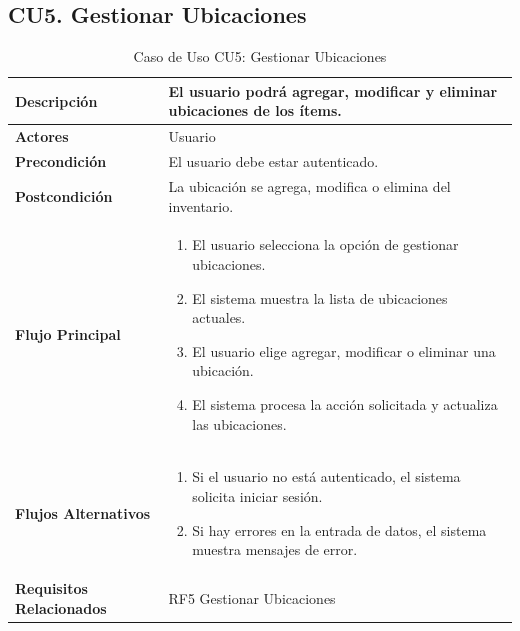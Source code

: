\documentclass{article}
\begin{document}
\subsection{CU5. Gestionar Ubicaciones}
\begin{table}[H]
    \centering
    \begin{tabular}{|l|p{10cm}|}
        \hline
        \textbf{Descripción} & El usuario podrá agregar, modificar y eliminar ubicaciones de los ítems. \\ \hline
        \textbf{Actores} & Usuario \\ \hline
        \textbf{Precondición} & El usuario debe estar autenticado. \\ \hline
        \textbf{Postcondición} & La ubicación se agrega, modifica o elimina del inventario. \\ \hline
        \textbf{Flujo Principal} & 
        \begin{enumerate}
            \item El usuario selecciona la opción de gestionar ubicaciones.
            \item El sistema muestra la lista de ubicaciones actuales.
            \item El usuario elige agregar, modificar o eliminar una ubicación.
            \item El sistema procesa la acción solicitada y actualiza las ubicaciones.
        \end{enumerate} \\ \hline
        \textbf{Flujos Alternativos} & 
        \begin{enumerate}
            \item Si el usuario no está autenticado, el sistema solicita iniciar sesión.
            \item Si hay errores en la entrada de datos, el sistema muestra mensajes de error.
        \end{enumerate} \\ \hline
        \textbf{Requisitos Relacionados} & RF5 Gestionar Ubicaciones \\ \hline
    \end{tabular}
    \caption{Caso de Uso CU5: Gestionar Ubicaciones}
\end{table}
\end{document}
